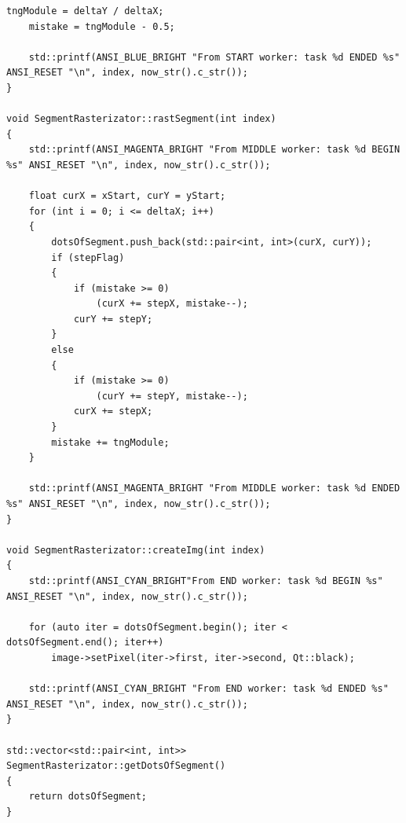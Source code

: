 \documentclass[12pt]{report}
\begin{document}
\begin{lstlisting}[caption=Разбиение алгоритма Брезенхема,
label={list:bresAlg}]
    tngModule = deltaY / deltaX;
    mistake = tngModule - 0.5;

    std::printf(ANSI_BLUE_BRIGHT "From START worker: task %d ENDED %s" ANSI_RESET "\n", index, now_str().c_str());
}

void SegmentRasterizator::rastSegment(int index)
{
    std::printf(ANSI_MAGENTA_BRIGHT "From MIDDLE worker: task %d BEGIN %s" ANSI_RESET "\n", index, now_str().c_str());

    float curX = xStart, curY = yStart;
    for (int i = 0; i <= deltaX; i++)
    {
        dotsOfSegment.push_back(std::pair<int, int>(curX, curY));
        if (stepFlag)
        {
            if (mistake >= 0)
                (curX += stepX, mistake--);
            curY += stepY;
        }
        else
        {
            if (mistake >= 0)
                (curY += stepY, mistake--);
            curX += stepX;
        }
        mistake += tngModule;
    }

    std::printf(ANSI_MAGENTA_BRIGHT "From MIDDLE worker: task %d ENDED %s" ANSI_RESET "\n", index, now_str().c_str());
}

void SegmentRasterizator::createImg(int index)
{
    std::printf(ANSI_CYAN_BRIGHT"From END worker: task %d BEGIN %s" ANSI_RESET "\n", index, now_str().c_str());

    for (auto iter = dotsOfSegment.begin(); iter < dotsOfSegment.end(); iter++)
        image->setPixel(iter->first, iter->second, Qt::black);

    std::printf(ANSI_CYAN_BRIGHT "From END worker: task %d ENDED %s" ANSI_RESET "\n", index, now_str().c_str());
}

std::vector<std::pair<int, int>> SegmentRasterizator::getDotsOfSegment()
{
    return dotsOfSegment;
}
\end{lstlisting}
\end{document}
